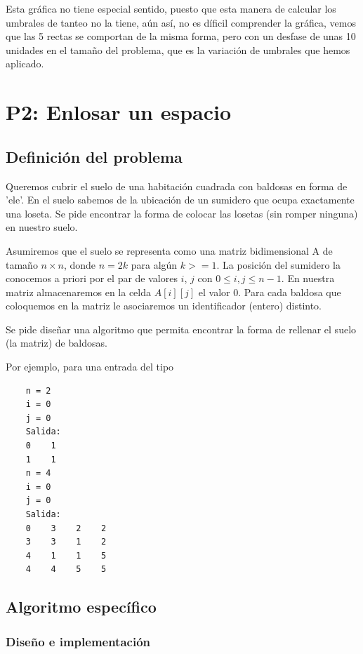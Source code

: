 \documentclass{article}
\begin{document}
    Esta gráfica no tiene especial sentido, puesto que esta manera de calcular los umbrales de tanteo no la tiene, aún así, no es díficil comprender la gráfica, vemos que las 5 rectas se comportan de la misma forma, pero con un desfase de unas 10 unidades en el tamaño del problema, que es la variación de umbrales que hemos aplicado.
\newpage

\section{P2: Enlosar un espacio}

\subsection{Definición del problema}

    Queremos cubrir el suelo de una habitación cuadrada con baldosas en
    forma de ’ele’. En el suelo sabemos de la ubicación de un 
    sumidero que ocupa exactamente una loseta. Se pide
    encontrar la forma de colocar las losetas (sin romper ninguna) en
    nuestro suelo.
    
    Asumiremos que el suelo se representa como una matriz bidimensional
    A de tamaño $n \times n$,
    donde $n = 2k$ para algún $k >= 1$. La posición del sumidero la
    conocemos a priori por el par
    de valores $i$, $j$ con $0 \leq i, j \leq n - 1$. En nuestra matriz
    almacenaremos en la celda $A[i][j]$ el
    valor 0. Para cada baldosa que coloquemos en la matriz le asociaremos
    un identificador (entero)
    distinto. 
    
    Se pide diseñar una algoritmo que permita encontrar la forma de 
    rellenar el suelo (la matriz)
    de baldosas. 
    
    Por ejemplo, para una entrada del tipo
    \begin{verbatim}
    n = 2 
    i = 0 
    j = 0 
    Salida:
    0    1
    1    1
    n = 4
    i = 0
    j = 0
    Salida:
    0    3    2    2
    3    3    1    2
    4    1    1    5
    4    4    5    5
    \end{verbatim}

\subsection{Algoritmo específico} 

\subsubsection{Diseño e implementación} %
\end{document}
